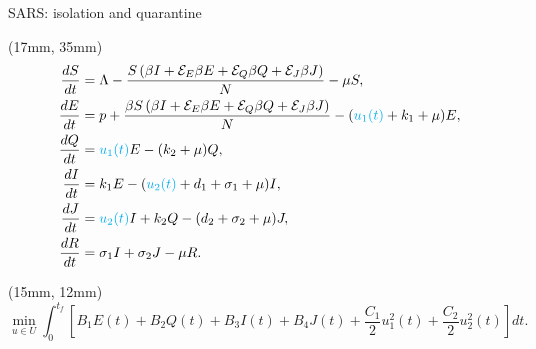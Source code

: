 \begin{frame}{SARS: isolation and quarantine}

    \begin{textblock*}{65mm}(17mm, 35mm)
     \begin{equation*}\label{eqn:sars_model}
        \begin{aligned}
            \dfrac{dS}{dt} &=
                \Lambda 
                -\dfrac{
                    S
                    \left(
                        \beta I 
                        + \mathcal{E}_E  \beta E
                        + \mathcal{E}_Q  \beta Q
                        + \mathcal{E}_J  \beta J
                    \right)
                }{N}
                - \mu S,
            \\
            \dfrac{dE}{dt} &=
                p +
                \dfrac{
                    \beta S
                    \left(
                        \beta I 
                            + \mathcal{E}_E \beta E
                            + \mathcal{E}_Q \beta Q
                            + \mathcal{E}_J \beta J
                    \right)
                }
                {N}
                -(
                    \textcolor{cyan}{u_1(t)}
                     + k_1 + \mu
                )E,
            \\
            \dfrac{dQ}{dt} &=
                 \textcolor{cyan}{u_1(t)}
                 E - (k_2 + \mu) Q,
            \\
            \dfrac{dI}{dt} &=
                k_1 E 
                -(
                    \textcolor{cyan}{u_2(t)}
                + d_1  + \sigma_1 + \mu) I,
            \\
            \dfrac{dJ}{dt} &=
                    \textcolor{cyan}{u_2(t)}
                  I 
                + k_2 Q
                - (d_2 + \sigma_2 + \mu) J,
            \\
            \dfrac{dR}{dt} &=
                \sigma_1 I
                +\sigma_2 J
                - \mu R.
        \end{aligned}
     \end{equation*}
    \end{textblock*}
        
    \begin{textblock*}{55mm}(15mm, 12mm)
            \begin{equation*}\label{eqn:sars_cost}
              \min_{u \in U}\int_{0}^{t_f}
                  \left[
                    B_1 E(t)
                    + B_2 Q(t)
                    + B_3 I(t)
                    + B_4 J(t)
                    + \frac{C_1}{2} u_1^2 (t)
                    + \frac{C_2}{2} u_2^2 (t)
                  \right]
                  dt.
            \end{equation*}
    \end{textblock*}
\end{frame}

